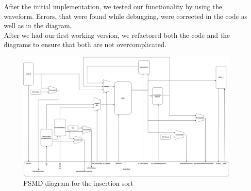 \documentclass[conference]{IEEEtran}
\begin{document}
After the initial implementation, we tested our functionality by using the waveform. Errors, that were found while debugging, were corrected in the code as well as in the diagram.\\
After we had our first working version, we refactored both the code and the diagrams to ensure that both are not overcomplicated. 
\begin{figure}
    \centering
    \includegraphics[width=1\linewidth]{Images/FSMDInsertionSort.png}
    \caption{FSMD diagram for the insertion sort}\label{fig:fsmd}
\end{figure}
\end{document}
